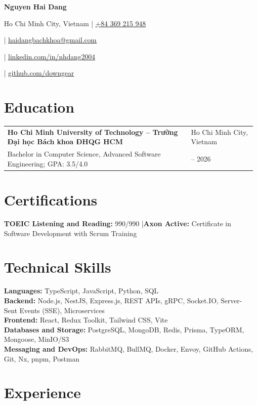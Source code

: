 \documentclass[10pt,a4paper]{article}
\makeatletter
\newcommand{\educationentry}[4]{%
    \begin{tabularx}{\textwidth}{@{}X>{\raggedleft\arraybackslash}p{0.28\textwidth}@{}}
        \textbf{#1} & #2 \\
        #3 & #4
    \end{tabularx}%
}
\newcommand{\resumelink}[2]{%
    \href{#1}{\textcolor{linkColor}{\underline{#2}}}%
}
\makeatother
\begin{document}
\begin{center}
    {\LARGE\bfseries Nguyen Hai Dang}\\[0.25em]
    {\small
    Ho Chi Minh City, Vietnam
    \enspace|\enspace
    \resumelink{tel:+84369215948}{+84 369 215 948}
    \enspace|\enspace
    \resumelink{mailto:haidangbachkhoa@gmail.com}{haidangbachkhoa@gmail.com}
    \enspace|\enspace
    \resumelink{https://www.linkedin.com/in/nhdang2004/}{linkedin.com/in/nhdang2004}
    \enspace|\enspace
    \resumelink{https://github.com/downgear}{github.com/downgear}}
\end{center}

\section{Education}

\educationentry
    {Ho Chi Minh University of Technology -- {\fontencoding{T5}\fontfamily{qtm}\selectfont Trường Đại học Bách khoa ĐHQG HCM}}
    {Ho Chi Minh City, Vietnam}
    {Bachelor in Computer Science, Advanced Software Engineering; GPA: 3.5/4.0}
    {2022 -- 2026}

\section{Certifications}

\textbf{TOEIC Listening and Reading:} 990/990 \enspace|\enspace \textbf{Axon Active:} Certificate in Software Development with Scrum Training

\section{Technical Skills}

\textbf{Languages:} TypeScript, JavaScript, Python, SQL\\
\textbf{Backend:} Node.js, NestJS, Express.js, REST APIs, gRPC, Socket.IO, Server-Sent Events (SSE), Microservices\\
\textbf{Frontend:} React, Redux Toolkit, Tailwind CSS, Vite\\
\textbf{Databases and Storage:} PostgreSQL, MongoDB, Redis, Prisma, TypeORM, Mongoose, MinIO/S3\\
\textbf{Messaging and DevOps:} RabbitMQ, BullMQ, Docker, Envoy, GitHub Actions, Git, Nx, pnpm, Postman

\section{Experience}
\end{document}

